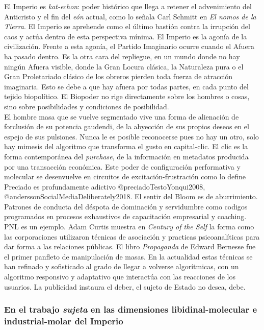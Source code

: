 \documentclass[
]{article}
\begin{document}
El Imperio es \emph{kat-echon}: poder histórico que llega a retener el
advenimiento del Anticristo y el fin del \emph{eón} actual, como lo
señala Carl Schmitt en \emph{El nomos de la Tierra}. El Imperio se
aprehende como el último bastión contra la irrupción del caos y actúa
dentro de esta perspectiva mínima. El Imperio es la agonía de la
civilización. Frente a esta agonía, el Partido Imaginario ocurre cuando
el Afuera ha pasado dentro. Es la otra cara del repliegue, en un mundo
donde no hay ningún Afuera visible, donde la Gran Locura clásica, la
Naturaleza pura o el Gran Proletariado clásico de los obreros pierden
toda fuerza de atracción imaginaria. Esto se debe a que hay afuera por
todas partes, en cada punto del tejido biopolítico. El Biopoder no rige
directamente sobre los hombres o cosas, sino sobre posibilidades y
condiciones de posibilidad.\\
El hombre masa que se vuelve segmentado vive una forma de alienación de
forclusión de su potencia gaudendi, de la abyección de sus propios
deseos en el espejo de sus pulsiones. Nunca le es posible reconocerse
pues no hay un otro, solo hay mimesis del algoritmo que transforma el
gusto en capital-clic. El clic es la forma contemporánea del
\emph{purchase}, de la información en metadatos producida por una
transacción económica. Este poder de configuración performativa y
molecular se desenvuelve en circuitos de excitación-frustración como lo
define Preciado es profundamente adictivo @preciadoTestoYonqui2008,
@anderssonSocialMediaDeliberately2018. El sentir del Bloom es de
aburrimiento. Patrones de conducta del déspota de dominación y
servidumbre como codigos programados en procesos exhaustivos de
capacitación empresarial y coaching. PNL es un ejemplo. Adam Curtis
muestra en \emph{Century of the Self} la forma como las corporaciones
utilizaron técnicas de asociación y practicas psicoanalíticas para dar
forma a las relaciones públicas. El libro \emph{Propaganda} de Edward
Bernesse fue el primer panfleto de manipulación de masas. En la
actualidad estas técnicas se han refinado y sofisticado al grado de
llegar a volverse algorítmicas, con un algoritmo responsivo y adaptativo
que interactúa con las reacciones de los usuarios. La publicidad
instaura el deber, el sujeto de Estado no desea, debe.

\hypertarget{en-el-trabajo-sujeta-en-las-dimensiones-libidinal-molecular-e-industrial-molar-del-imperio}{%
\subsubsection{\texorpdfstring{En el trabajo \emph{sujeta} en las
dimensiones libidinal-molecular e industrial-molar del
Imperio}{En el trabajo sujeta en las dimensiones libidinal-molecular e industrial-molar del Imperio}}\label{en-el-trabajo-sujeta-en-las-dimensiones-libidinal-molecular-e-industrial-molar-del-imperio}}
\end{document}
